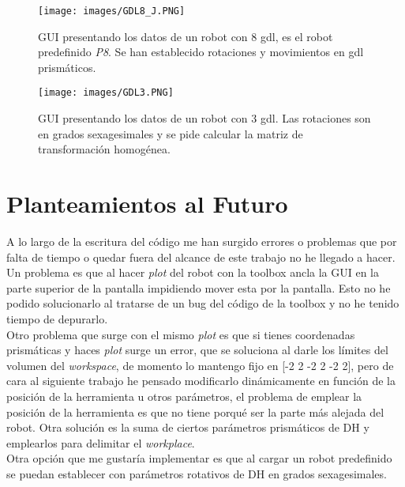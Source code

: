 \documentclass[a4paper, fontsize=11pt]{scrartcl} %
\numberwithin{equation}{section} %
\numberwithin{figure}{section} %
\numberwithin{table}{section} %
\begin{document}
	\begin{figure}[h!]
		\centering
		\texttt{[image: images/GDL8\_J.PNG]}
		\caption{GUI presentando los datos de un robot con 8 gdl, es el robot predefinido \textit{P8}. Se han establecido rotaciones y movimientos en gdl prismáticos.}
		\label{GDL8_J}
	\end{figure}
	\FloatBarrier
	
	\begin{figure}[h!]
		\centering
		\texttt{[image: images/GDL3.PNG]}
		\caption{GUI presentando los datos de un robot con 3 gdl. Las rotaciones son en grados sexagesimales y se pide calcular la matriz de transformación homogénea.}
		\label{GDL3}
	\end{figure}
	\FloatBarrier
	
	\section{Planteamientos al Futuro}
	
	A lo largo de la escritura del código me han surgido errores o problemas que por falta de tiempo o quedar fuera del alcance de este trabajo no he llegado a hacer.\\
	
	Un problema es que al hacer \textit{plot} del robot con la toolbox ancla la GUI en la parte superior de la pantalla impidiendo mover esta por la pantalla. Esto no he podido solucionarlo al tratarse de un bug del código de la toolbox y no he tenido tiempo de depurarlo.\\
	
	Otro problema que surge con el mismo \textit{plot} es que si tienes coordenadas prismáticas y haces \textit{plot} surge un error, que se soluciona al darle los límites del volumen del \textit{workspace}, de momento lo mantengo fijo en [-2 2 -2 2 -2 2], pero de cara al siguiente trabajo he pensado modificarlo dinámicamente en función de la posición de la herramienta u otros parámetros, el problema de emplear la posición de la herramienta es que no tiene porqué ser la parte más alejada del robot. Otra solución es la suma de ciertos parámetros prismáticos de DH y emplearlos para delimitar el \textit{workplace}.\\
	
	Otra opción que me gustaría implementar es que al cargar un robot predefinido se puedan establecer con parámetros rotativos de DH en grados sexagesimales.\\
	
\end{document}
